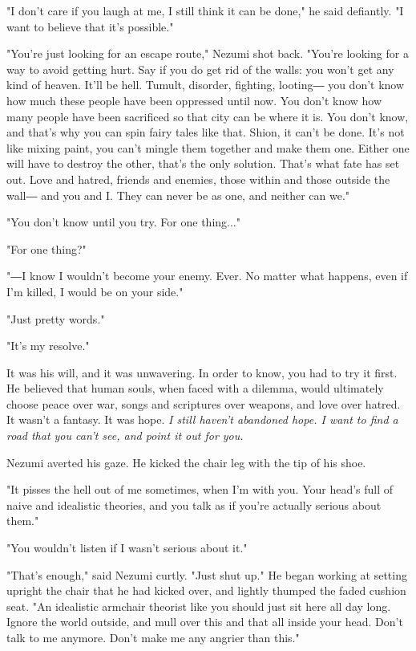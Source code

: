 "I don't care if you laugh at me, I still think it can be done," he said
defiantly. "I want to believe that it's possible."

"You're just looking for an escape route," Nezumi shot back. "You're
looking for a way to avoid getting hurt. Say if you do get rid of the
walls: you won't get any kind of heaven. It'll be hell. Tumult,
disorder, fighting, looting― you don't know how much these people have
been oppressed until now. You don't know how many people have been
sacrificed so that city can be where it is. You don't know, and that's
why you can spin fairy tales like that. Shion, it can't be done. It's
not like mixing paint, you can't mingle them together and make them one.
Either one will have to destroy the other, that's the only solution.
That's what fate has set out. Love and hatred, friends and enemies,
those within and those outside the wall― and you and I. They can never
be as one, and neither can we."

\mybreak

"You don't know until you try. For one thing..."

"For one thing?"

"―I know I wouldn't become your enemy. Ever. No matter what happens,
even if I'm killed, I would be on your side."

"Just pretty words."

"It's my resolve."

It was his will, and it was unwavering. In order to know, you had to try
it first. He believed that human souls, when faced with a dilemma, would
ultimately choose peace over war, songs and scriptures over weapons, and
love over hatred. It wasn't a fantasy. It was hope. \emph{I still haven't
	abandoned hope. I want to find a road that you can't see, and point it
	out for you.}

Nezumi averted his gaze. He kicked the chair leg with the tip of his
shoe.

"It pisses the hell out of me sometimes, when I'm with you. Your head's
full of naive and idealistic theories, and you talk as if you're
actually serious about them."

"You wouldn't listen if I wasn't serious about it."

"That's enough," said Nezumi curtly. "Just shut up." He began working at
setting upright the chair that he had kicked over, and lightly thumped
the faded cushion seat. "An idealistic armchair theorist like you should
just sit here all day long. Ignore the world outside, and mull over this
and that all inside your head. Don't talk to me anymore. Don't make me
any angrier than this."

